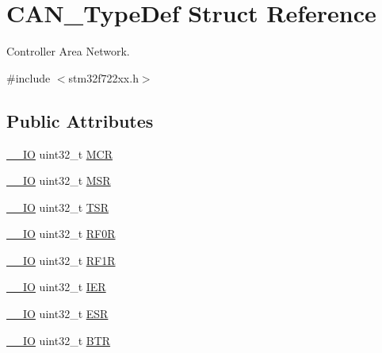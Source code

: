 \hypertarget{struct_c_a_n___type_def}{}\section{C\+A\+N\+\_\+\+Type\+Def Struct Reference}
\label{struct_c_a_n___type_def}


Controller Area Network.  




{\ttfamily \#include $<$stm32f722xx.\+h$>$}

\subsection*{Public Attributes}
\begin{DoxyCompactItemize}
\item 
\mbox{\hyperlink{core__sc300_8h_aec43007d9998a0a0e01faede4133d6be}{\+\_\+\+\_\+\+IO}} uint32\+\_\+t \mbox{\hyperlink{struct_c_a_n___type_def_a1282eee79a22003257a7a5daa7f4a35f}{M\+CR}}
\item 
\mbox{\hyperlink{core__sc300_8h_aec43007d9998a0a0e01faede4133d6be}{\+\_\+\+\_\+\+IO}} uint32\+\_\+t \mbox{\hyperlink{struct_c_a_n___type_def_af98b957a4e887751fbd407d3e2cf93b5}{M\+SR}}
\item 
\mbox{\hyperlink{core__sc300_8h_aec43007d9998a0a0e01faede4133d6be}{\+\_\+\+\_\+\+IO}} uint32\+\_\+t \mbox{\hyperlink{struct_c_a_n___type_def_acbc82ac4e87e75350fc586be5e56d95b}{T\+SR}}
\item 
\mbox{\hyperlink{core__sc300_8h_aec43007d9998a0a0e01faede4133d6be}{\+\_\+\+\_\+\+IO}} uint32\+\_\+t \mbox{\hyperlink{struct_c_a_n___type_def_ad8e858479e26ab075ee2ddb630e8769d}{R\+F0R}}
\item 
\mbox{\hyperlink{core__sc300_8h_aec43007d9998a0a0e01faede4133d6be}{\+\_\+\+\_\+\+IO}} uint32\+\_\+t \mbox{\hyperlink{struct_c_a_n___type_def_a69a528d1288c1de666df68655af1d20e}{R\+F1R}}
\item 
\mbox{\hyperlink{core__sc300_8h_aec43007d9998a0a0e01faede4133d6be}{\+\_\+\+\_\+\+IO}} uint32\+\_\+t \mbox{\hyperlink{struct_c_a_n___type_def_a530babbc4b9584c93a1bf87d6ce8b8dc}{I\+ER}}
\item 
\mbox{\hyperlink{core__sc300_8h_aec43007d9998a0a0e01faede4133d6be}{\+\_\+\+\_\+\+IO}} uint32\+\_\+t \mbox{\hyperlink{struct_c_a_n___type_def_ab1a1b6a7c587443a03d654d3b9a94423}{E\+SR}}
\item 
\mbox{\hyperlink{core__sc300_8h_aec43007d9998a0a0e01faede4133d6be}{\+\_\+\+\_\+\+IO}} uint32\+\_\+t \mbox{\hyperlink{struct_c_a_n___type_def_accad1e4155459a13369f5ad0e7c6da29}{B\+TR}}

\end{DoxyCompactItemize}

